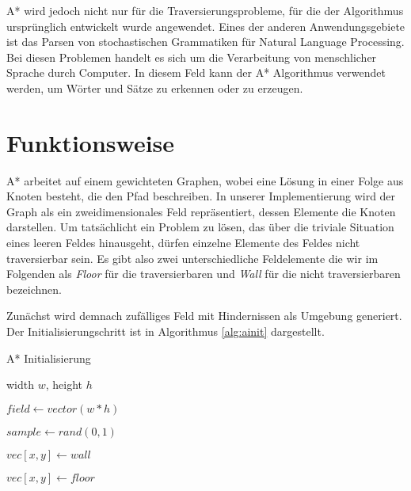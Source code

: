 \documentclass[10pt,twocolumn]{scrartcl}
\begin{document}
A* wird jedoch nicht nur für die Traversierungsprobleme, für die der Algorithmus ursprünglich entwickelt wurde angewendet.
Eines der anderen Anwendungsgebiete ist das Parsen von stochastischen Grammatiken für Natural Language Processing.
Bei diesen Problemen handelt es sich um die Verarbeitung von menschlicher Sprache durch Computer.
In diesem Feld kann der A* Algorithmus verwendet werden, um Wörter und Sätze zu erkennen oder zu erzeugen.

\section*{Funktionsweise}


A* arbeitet auf einem gewichteten Graphen, wobei eine Lösung in einer Folge aus Knoten besteht, die den Pfad beschreiben. In unserer Implementierung wird der Graph als ein zweidimensionales Feld repräsentiert, dessen Elemente die Knoten darstellen. Um tatsächlicht ein Problem zu lösen, das über die triviale Situation eines leeren Feldes hinausgeht, dürfen einzelne Elemente des Feldes nicht traversierbar sein. Es gibt also zwei unterschiedliche Feldelemente die wir im Folgenden als \textit{Floor} für die traversierbaren und \textit{Wall} für die nicht traversierbaren bezeichnen.


Zunächst wird demnach zufälliges Feld mit Hindernissen als Umgebung generiert. Der Initialisierungschritt ist in Algorithmus \ref{alg:ainit} dargestellt. 

\begin{algorithm} 
\caption{A* Initialisierung} 
\label{alg:ainit} 
\begin{algorithmic}
	\REQUIRE width $w$, height $h$
	
	\STATE $field \leftarrow vector(w*h)$
	
	

	\STATE $sample \leftarrow rand(0,1)$	

	\STATE $vec[x,y] \leftarrow wall$	
	
	\ELSE
	
	\STATE $vec[x,y] \leftarrow floor$	
	
	\ENDIF	
	
	\ENDFOR
	\ENDFOR
\end{algorithmic}
\end{algorithm}
\end{document}
